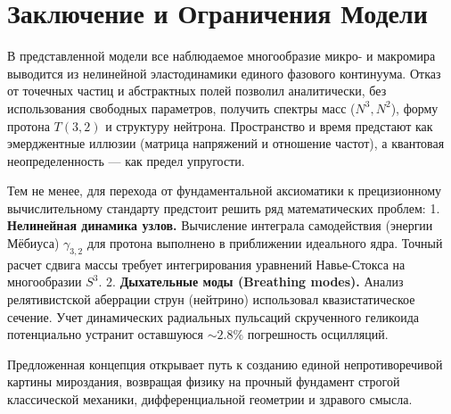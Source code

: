 \documentclass[11pt,a4paper]{article}
\begin{document}
\section*{Заключение и Ограничения Модели}

В представленной модели все наблюдаемое многообразие микро- и макромира выводится из нелинейной эластодинамики единого фазового континуума. Отказ от точечных частиц и абстрактных полей позволил аналитически, без использования свободных параметров, получить спектры масс ($N^3, N^2$), форму протона $T(3,2)$ и структуру нейтрона. Пространство и время предстают как эмерджентные иллюзии (матрица напряжений и отношение частот), а квантовая неопределенность — как предел упругости.

Тем не менее, для перехода от фундаментальной аксиоматики к прецизионному вычислительному стандарту предстоит решить ряд математических проблем:
1. \textbf{Нелинейная динамика узлов.} Вычисление интеграла самодействия (энергии Мёбиуса) $\gamma_{3,2}$ для протона выполнено в приближении идеального ядра. Точный расчет сдвига массы требует интегрирования уравнений Навье-Стокса на многообразии $S^3$.
2. \textbf{Дыхательные моды (Breathing modes).} Анализ релятивистской аберрации струн (нейтрино) использовал квазистатическое сечение. Учет динамических радиальных пульсаций скрученного геликоида потенциально устранит оставшуюся $\sim 2.8\%$ погрешность осцилляций.

Предложенная концепция открывает путь к созданию единой непротиворечивой картины мироздания, возвращая физику на прочный фундамент строгой классической механики, дифференциальной геометрии и здравого смысла.
\end{document}
